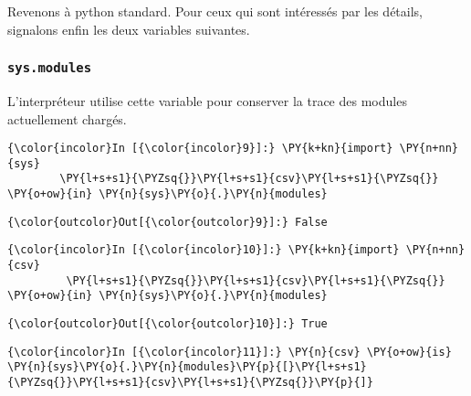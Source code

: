     Revenons à python standard. Pour ceux qui sont intéressés par les
détails, signalons enfin les deux variables suivantes.

    \hypertarget{sys.modules}{%
\subsubsection{\texorpdfstring{\texttt{sys.modules}}{sys.modules}}\label{sys.modules}}

    L'interpréteur utilise cette variable pour conserver la trace des
modules actuellement chargés.

    \begin{Verbatim}[commandchars=\\\{\},frame=single,framerule=0.3mm,rulecolor=\color{cellframecolor}]
{\color{incolor}In [{\color{incolor}9}]:} \PY{k+kn}{import} \PY{n+nn}{sys}
        \PY{l+s+s1}{\PYZsq{}}\PY{l+s+s1}{csv}\PY{l+s+s1}{\PYZsq{}} \PY{o+ow}{in} \PY{n}{sys}\PY{o}{.}\PY{n}{modules}
\end{Verbatim}


\begin{Verbatim}[commandchars=\\\{\},frame=single,framerule=0.3mm,rulecolor=\color{cellframecolor}]
{\color{outcolor}Out[{\color{outcolor}9}]:} False
\end{Verbatim}
            
    \begin{Verbatim}[commandchars=\\\{\},frame=single,framerule=0.3mm,rulecolor=\color{cellframecolor}]
{\color{incolor}In [{\color{incolor}10}]:} \PY{k+kn}{import} \PY{n+nn}{csv}
         \PY{l+s+s1}{\PYZsq{}}\PY{l+s+s1}{csv}\PY{l+s+s1}{\PYZsq{}} \PY{o+ow}{in} \PY{n}{sys}\PY{o}{.}\PY{n}{modules}
\end{Verbatim}


\begin{Verbatim}[commandchars=\\\{\},frame=single,framerule=0.3mm,rulecolor=\color{cellframecolor}]
{\color{outcolor}Out[{\color{outcolor}10}]:} True
\end{Verbatim}
            
    \begin{Verbatim}[commandchars=\\\{\},frame=single,framerule=0.3mm,rulecolor=\color{cellframecolor}]
{\color{incolor}In [{\color{incolor}11}]:} \PY{n}{csv} \PY{o+ow}{is} \PY{n}{sys}\PY{o}{.}\PY{n}{modules}\PY{p}{[}\PY{l+s+s1}{\PYZsq{}}\PY{l+s+s1}{csv}\PY{l+s+s1}{\PYZsq{}}\PY{p}{]}
\end{Verbatim}


